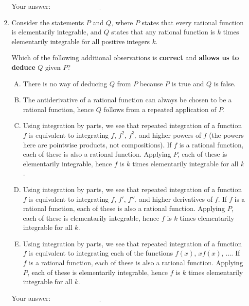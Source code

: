 \documentclass[10pt]{amsart}
\begin{document}
\begin{enumerate}
  \vspace{0.05in}
  Your answer: $\underline{\qquad\qquad\qquad\qquad\qquad\qquad\qquad}$
  \vspace{0.05in}

\item Consider the statements $P$ and $Q$, where $P$ states that every
  rational function is elementarily integrable, and $Q$ states that
  any rational function is $k$ times elementarily integrable for all
  positive integers $k$.

  Which of the following additional observations is {\bf correct} and
  {\bf allows us to deduce} $Q$ given $P$?

  \begin{enumerate}[(A)]
  \item There is no way of deducing $Q$ from $P$ because $P$ is true
    and $Q$ is false.
  \item The antiderivative of a rational function can always be chosen
    to be a rational function, hence $Q$ follows from a repeated
    application of $P$.
  \item Using integration by parts, we see that repeated integration
    of a function $f$ is equivalent to integrating $f$, $f^2$, $f^3$,
    and higher powers of $f$ (the powers here are pointwise products,
    not compositions). If $f$ is a rational function, each of these is
    also a rational function. Applying $P$, each of these is
    elementarily integrable, hence $f$ is $k$ times elementarily
    integrable for all $k$.
  \item Using integration by parts, we see that repeated integration
    of a function $f$ is equivalent to integrating $f$, $f'$, $f''$,
    and higher derivatives of $f$. If $f$ is a rational function, each
    of these is also a rational function. Applying $P$, each of these
    is elementarily integrable, hence $f$ is $k$ times elementarily
    integrable for all $k$.
  \item Using integration by parts, we see that repeated integration
    of a function $f$ is equivalent to integrating each of the
    functions $f(x)$, $xf(x)$, $\dots$. If $f$ is a rational function,
    each of these is also a rational function. Applying $P$, each of
    these is elementarily integrable, hence $f$ is $k$ times
    elementarily integrable for all $k$.
  \end{enumerate}

  \vspace{0.05in}
  Your answer: $\underline{\qquad\qquad\qquad\qquad\qquad\qquad\qquad}$
  \vspace{0.05in}


\end{enumerate}
\end{document}
